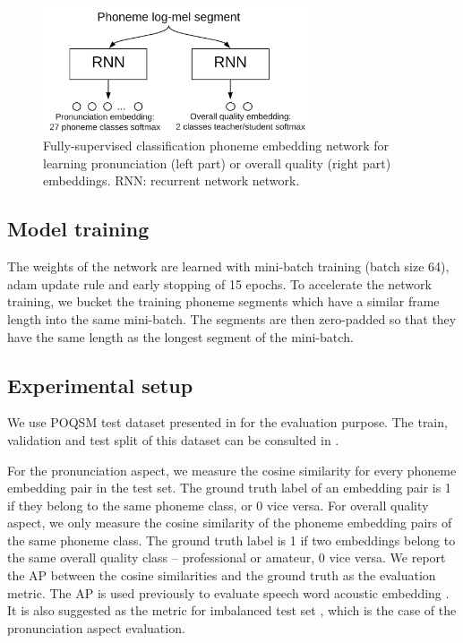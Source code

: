 \begin{figure}[ht!]
    \centering
    \includegraphics[width=0.7\textwidth]{figs/ch7/classification_net.png}
    \caption{Fully-supervised classification phoneme embedding network for learning pronunciation (left part) or overall quality (right part) embeddings. \gls{RNN}: recurrent network network.}
    \label{fig:ch7:classification_net}
\end{figure}

\subsection{Model training}

The weights of the network are learned with mini-batch training (batch size 64), adam \cite{kingma2014adam} update rule and early stopping of 15 epochs. To accelerate the network training, we bucket the training phoneme segments which have a similar frame length into the same mini-batch. The segments are then zero-padded so that they have the same length as the longest segment of the mini-batch. 

\subsection{Experimental setup}\label{sec:ch7:experimental_setup_classification}

We use \gls{POQSM} test dataset presented in  for the evaluation purpose. The train, validation and test split of this dataset can be consulted in .

For the pronunciation aspect, we measure the cosine similarity for every phoneme embedding pair in the test set. The ground truth label of an embedding pair is 1 if they belong to the same phoneme class, or 0 vice versa. For overall quality aspect, we only measure the cosine similarity of the phoneme embedding pairs of the same phoneme class. The ground truth label is 1 if two embeddings belong to the same overall quality class -- professional or amateur, 0 vice versa. We report the \gls{AP} between the cosine similarities and the ground truth as the evaluation metric. The \gls{AP} is used previously to evaluate speech word acoustic embedding \cite{Kampera,Settle2016a}. It is also suggested as the metric for imbalanced test set \cite{Davis2006}, which is the case of the pronunciation aspect evaluation.

